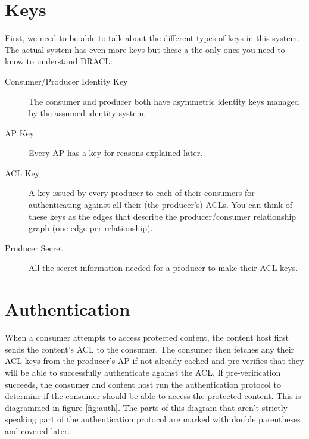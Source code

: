 \documentclass[pdftex,12pt,a4papaer,twoside,notitlepage]{report}
\begin{document}
\section{Keys}

First, we need to be able to talk about the different types of keys in this
system. The actual system has even more keys but these a the only ones you need
to know to understand DRACL:

\begin{description}
\item[Consumer/Producer Identity Key] The consumer and producer both have
  asymmetric identity keys managed by the assumed identity system.
\item[AP Key] Every AP has a key for reasons explained later.
\item[ACL Key] A key issued by every producer to each of their consumers for
  authenticating against all their (the producer's) ACLs. You can think of these
  keys as the edges that describe the producer/consumer relationship graph (one
  edge per relationship).
\item[Producer Secret] All the secret information needed for a producer to make
  their ACL keys.
\end{description}

\section{Authentication}
\label{sub:authentication}

When a consumer attempts to access protected content, the content host first
sends the content's ACL to the consumer. The consumer then fetches any their ACL
keys from the producer's AP if not already cached and pre-verifies that they
will be able to successfully authenticate against the ACL. If pre-verification
succeeds, the consumer and content host run the authentication protocol to
determine if the consumer should be able to access the protected content. This
is diagrammed in figure \cref{fig:auth}. The parts of this diagram that aren't
strictly speaking part of the authentication protocol are marked with double
parentheses and covered later.
\end{document}
